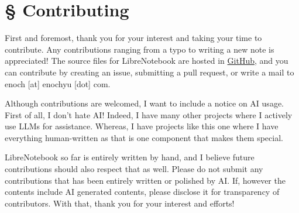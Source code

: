 \documentclass[../main.tex]{subfiles}
\begin{document}
\section*{\S\! Contributing}

First and foremost, thank you for your interest and taking your time
to contribute. Any contributions ranging from a typo to writing a new
note is appreciated! The source files for LibreNotebook are hosted
in \href{https://github.com/enochness/LibreNotebook}{GitHub},
and you can contribute by creating an issue, submitting a pull
request, or write a mail to enoch [at] enochyu [dot] com.

Although contributions are welcomed, I want to include a notice on
AI usage. First of all, I don't hate AI! Indeed, I have many other
projects where I actively use LLMs for assistance. Whereas,
I have projects like this one where I have everything human-written
as that is one component that makes them special.

LibreNotebook so far is entirely written by hand, and I believe
future contributions should also respect that as well. Please do not
submit any contributions that has been entirely written or polished
by AI. If, however the contents include AI generated contents,
please disclose it for transparency of contributors. With that,
thank you for your interest and efforts!
\end{document}
